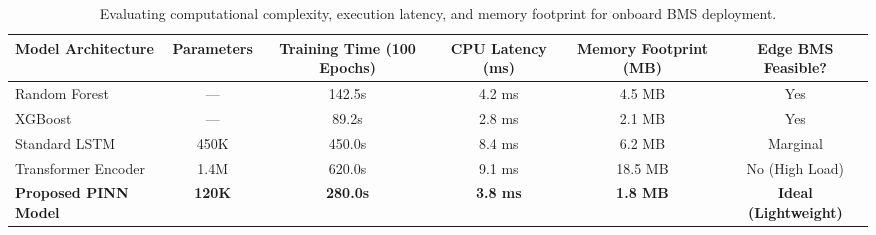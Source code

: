 \begin{table}[htbp]
\centering
\caption{Evaluating computational complexity, execution latency, and memory footprint for onboard BMS deployment.}
\label{tab:bms_feasibility}
\begin{tabular}{lccccc}
\toprule
\textbf{Model Architecture} & \textbf{Parameters} & \textbf{Training Time (100 Epochs)} & \textbf{CPU Latency (ms)} & \textbf{Memory Footprint (MB)} & \textbf{Edge BMS Feasible?} \\
\midrule
Random Forest & — & 142.5s & 4.2 ms & 4.5 MB & Yes \\
XGBoost & — & 89.2s & 2.8 ms & 2.1 MB & Yes \\
Standard LSTM & 450K & 450.0s & 8.4 ms & 6.2 MB & Marginal \\
Transformer Encoder & 1.4M & 620.0s & 9.1 ms & 18.5 MB & No (High Load) \\
\rowcolor{gray!15}\textbf{Proposed PINN Model} & \textbf{120K} & \textbf{280.0s} & \textbf{3.8 ms} & \textbf{1.8 MB} & \textbf{Ideal (Lightweight)} \\
\bottomrule
\end{tabular}
\end{table}